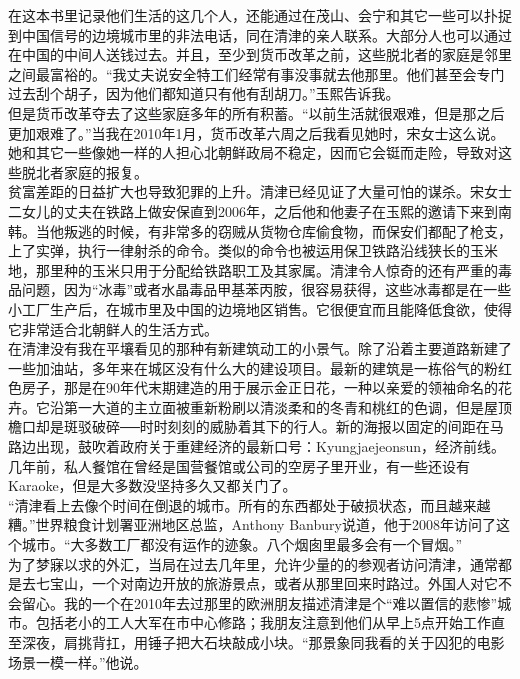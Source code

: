 在这本书里记录他们生活的这几个人，还能通过在茂山、会宁和其它一些可以扑捉到中国信号的边境城市里的非法电话，同在清津的亲人联系。大部分人也可以通过在中国的中间人送钱过去。并且，至少到货币改革之前，这些脱北者的家庭是邻里之间最富裕的。“我丈夫说安全特工们经常有事没事就去他那里。他们甚至会专门过去刮个胡子，因为他们都知道只有他有刮胡刀。”玉熙告诉我。\\

但是货币改革夺去了这些家庭多年的所有积蓄。“以前生活就很艰难，但是那之后更加艰难了。”当我在2010年1月，货币改革六周之后我看见她时，宋女士这么说。她和其它一些像她一样的人担心北朝鲜政局不稳定，因而它会铤而走险，导致对这些脱北者家庭的报复。\\

贫富差距的日益扩大也导致犯罪的上升。清津已经见证了大量可怕的谋杀。宋女士二女儿的丈夫在铁路上做安保直到2006年，之后他和他妻子在玉熙的邀请下来到南韩。当他叛逃的时候，有非常多的窃贼从货物仓库偷食物，而保安们都配了枪支，上了实弹，执行一律射杀的命令。类似的命令也被运用保卫铁路沿线狭长的玉米地，那里种的玉米只用于分配给铁路职工及其家属。清津令人惊奇的还有严重的毒品问题，因为“冰毒”或者水晶毒品甲基苯丙胺，很容易获得，这些冰毒都是在一些小工厂生产后，在城市里及中国的边境地区销售。它很便宜而且能降低食欲，使得它非常适合北朝鲜人的生活方式。\\

在清津没有我在平壤看见的那种有新建筑动工的小景气。除了沿着主要道路新建了一些加油站，多年来在城区没有什么大的建设项目。最新的建筑是一栋俗气的粉红色房子，那是在90年代末期建造的用于展示金正日花，一种以亲爱的领袖命名的花卉。它沿第一大道的主立面被重新粉刷以清淡柔和的冬青和桃红的色调，但是屋顶檐口却是斑驳破碎──时时刻刻的威胁着其下的行人。新的海报以固定的间距在马路边出现，鼓吹着政府关于重建经济的最新口号：Kyungjaejeonsun，经济前线。几年前，私人餐馆在曾经是国营餐馆或公司的空房子里开业，有一些还设有Karaoke，但是大多数没坚持多久又都关门了。\\

“清津看上去像个时间在倒退的城市。所有的东西都处于破损状态，而且越来越糟。”世界粮食计划署亚洲地区总监，Anthony Banbury说道，他于2008年访问了这个城市。“大多数工厂都没有运作的迹象。八个烟囱里最多会有一个冒烟。”\\

为了梦寐以求的外汇，当局在过去几年里，允许少量的的参观者访问清津，通常都是去七宝山，一个对南边开放的旅游景点，或者从那里回来时路过。外国人对它不会留心。我的一个在2010年去过那里的欧洲朋友描述清津是个“难以置信的悲惨”城市。包括老小的工人大军在市中心修路；我朋友注意到他们从早上5点开始工作直至深夜，肩挑背扛，用锤子把大石块敲成小块。“那景象同我看的关于囚犯的电影场景一模一样。”他说。\\

